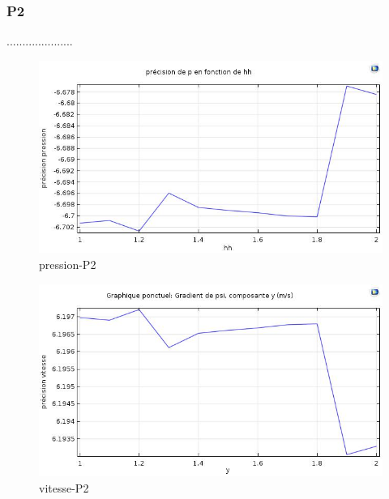 \documentclass[a4paper,11pt]{report} %
\begin{document}
\subsubsection{P2}.....................

\begin{figure}[!h]
\centering
\hspace*{0mm}\vfill
\begin{center} \includegraphics[width=1.\textwidth]{pression_P2.jpg} \end{center}
\vfill\hspace*{0mm}
\caption{pression-P2 }
\label{v_ponctuel}
\end{figure}\pagebreak

\begin{figure}[!h]
\centering
\hspace*{0mm}\vfill
\begin{center} \includegraphics[width=1.\textwidth]{vitesse_u_P2.jpg} \end{center}
\vfill\hspace*{0mm}
\caption{vitesse-P2 }
\label{v_ponctuel}
\end{figure}\pagebreak
\end{document}
